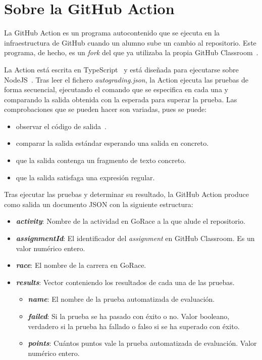 \section{Sobre la GitHub Action}
La GitHub Action es un programa autocontenido que se ejecuta en la infraestructura de GitHub cuando un alumno sube un cambio al repositorio. Este programa, de hecho, es un \textit{fork} del que ya utilizaba la propia GitHub Classroom~\cite{githubGitHubEducationautograding}.

La Action está escrita en TypeScript~\cite{typescript} y está diseñada para ejecutarse sobre NodeJS~\cite{nodejs}. Tras leer el fichero \textit{autograding.json}, la Action ejecuta las pruebas de forma secuencial, ejecutando el comando que se especifica en cada una y comparando la salida obtenida con la esperada para superar la prueba. Las comprobaciones que se pueden hacer son variadas, pues se puede:
\begin{itemize}
    \item observar el código de salida~\cite{exitcode}. 
    \item comparar la salida estándar esperando una salida en concreto.
    \item que la salida contenga un fragmento de texto concreto. 
    \item que la salida satisfaga una expresión regular.
\end{itemize}

Tras ejecutar las pruebas y determinar su resultado, la GitHub Action produce como salida un documento \acrshort{JSON} con la siguiente estructura:
\begin{itemize}
    \item \textbf{\textit{activity}}: Nombre de la actividad en GoRace a la que alude el repositorio.
    \item \textbf{\textit{assignmentId}}: El identificador del \textit{assignment} en GitHub Classroom. Es un valor numérico entero.
    \item \textbf{\textit{race}}: El nombre de la carrera en GoRace.
    \item \textbf{\textit{results}}: Vector conteniendo los resultados de cada una de las pruebas.
    \begin{itemize}
        \item \textbf{\textit{name}}: El nombre de la prueba automatizada de evaluación.
        \item \textbf{\textit{failed}}: Si la prueba se ha pasado con éxito o no. Valor booleano, verdadero si la prueba ha fallado o falso si se ha superado con éxito.
        \item \textbf{\textit{points}}: Cuántos puntos vale la prueba automatizada de evaluación. Valor numérico entero.
    \end{itemize}
\end{itemize}

